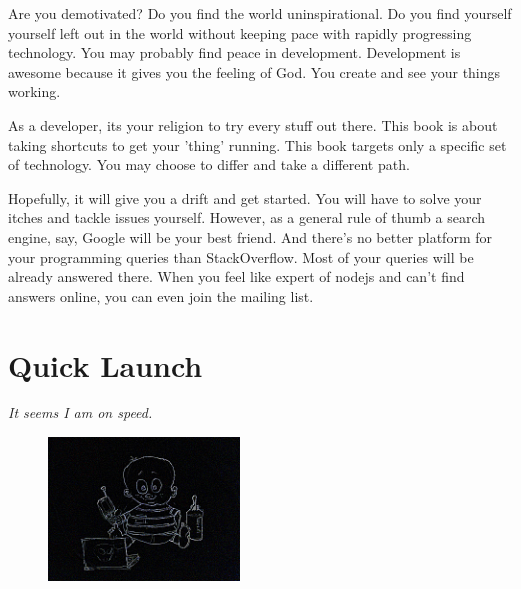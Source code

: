 \documentclass[12pt]{book}
\begin{document}
Are you demotivated? Do you find the world uninspirational. Do you find yourself yourself left out in the world without keeping pace with rapidly progressing technology. You may probably find peace in development. Development is awesome because it gives you the feeling of God. You create and see your things working.
\linebreak
\par
As a developer, its your religion to try every stuff out there. This book is about taking shortcuts to get your 'thing' running. This book targets only a specific set of technology. You may choose to differ and take a different path.
\linebreak
\par
Hopefully, it will give you a drift and get started. You will have to solve your itches and tackle issues yourself. However, as a general rule of thumb a search engine, say, Google will be your best friend. And there's no better platform for your programming queries than StackOverflow. Most of your queries will be already answered there. When you feel like expert of nodejs and can't find answers online, you can even join the mailing list.



\chapter{Quick Launch}
\begin{flushright}\textit{It seems I am on speed.}\end{flushright}

\begin{figure}
\begin{center}\includegraphics[width=2in]{org/art/getStartedHigh.png}\end{center}
\end{figure}
\end{document}
